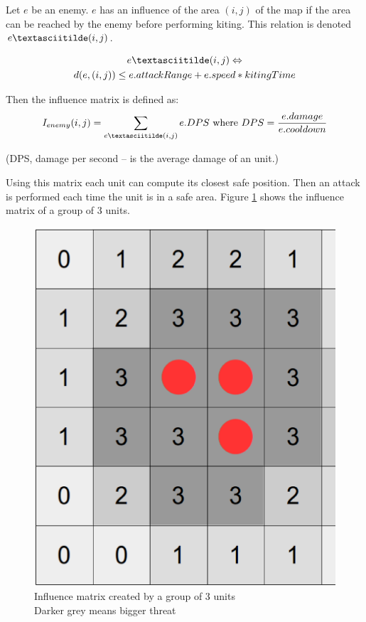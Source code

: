 Let $e$ be an enemy. $e$ has an influence of the area $(i,j)$ of the map if the area can be reached by the enemy before performing kiting.
This relation is denoted $e \textasciitilde (i,j)$.

\begin{multline*}
    e \textasciitilde (i,j) \Leftrightarrow \\ d(e,(i,j)) \leq e.attackRange + e.speed * kitingTime
\end{multline*}

Then the influence matrix is defined as:
$$
I_{enemy}(i,j) = \sum_{e \textasciitilde (i,j)}e.DPS \text{ where } DPS = \frac{e.damage}{e.cooldown}  
$$

(DPS, damage per second -- is the average damage of an unit.)

Using this matrix each unit can compute its closest safe position.
Then an attack is performed each time the unit is in a safe area.
Figure \ref{influenceMatrix} shows the influence matrix of a group of 3 units.

\begin{center}
    \begin{figure}[h!t]
        \centering
        \includegraphics[width=0.4\columnwidth]{fig/InfluenceMap.ps}
        \caption{Influence matrix created by a group of 3 units \\ 
        Darker grey means bigger threat}
        \label{influenceMatrix}
    \end{figure}
\end{center}

